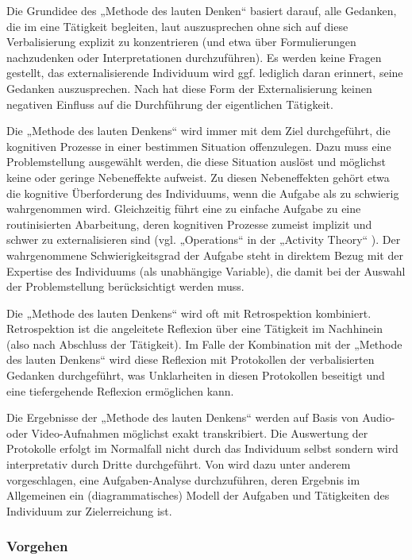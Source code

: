 Die Grundidee des „Methode des lauten Denken“ basiert darauf, alle Gedanken, die im eine Tätigkeit begleiten, laut auszusprechen ohne sich auf diese Verbalisierung explizit zu konzentrieren (und etwa über Formulierungen nachzudenken oder Interpretationen durchzuführen). Es werden keine Fragen gestellt, das externalisierende Individuum wird ggf. lediglich daran erinnert, seine Gedanken auszusprechen. Nach \citet{Van-Someren94} hat diese Form der Externalisierung keinen negativen Einfluss auf die Durchführung der eigentlichen Tätigkeit.

Die „Methode des lauten Denkens“ wird immer mit dem Ziel durchgeführt, die kognitiven Prozesse in einer bestimmen Situation offenzulegen. Dazu muss eine Problemstellung ausgewählt werden, die diese Situation auslöst und möglichst keine oder geringe Nebeneffekte aufweist. Zu diesen Nebeneffekten gehört etwa die kognitive Überforderung des Individuums, wenn die Aufgabe als zu schwierig wahrgenommen wird. Gleichzeitig führt eine zu einfache Aufgabe zu eine routinisierten Abarbeitung, deren kognitiven Prozesse zumeist implizit und schwer zu externalisieren sind (vgl. „Operations“ in der „Activity Theory“ \citep{Leontev78}). Der wahrgenommene Schwierigkeitsgrad der Aufgabe steht in direktem Bezug mit der Expertise des Individuums (als unabhängige Variable), die damit bei der Auswahl der Problemstellung berücksichtigt werden muss.

Die „Methode des lauten Denkens“ wird oft mit Retrospektion kombiniert. Retrospektion ist die angeleitete Reflexion über eine Tätigkeit im Nachhinein (also nach Abschluss der Tätigkeit). Im Falle der Kombination mit der „Methode des lauten Denkens“ wird diese Reflexion mit Protokollen der verbalisierten Gedanken durchgeführt, was Unklarheiten in diesen Protokollen beseitigt und eine tiefergehende Reflexion ermöglichen kann. 

Die Ergebnisse der „Methode des lauten Denkens“ werden auf Basis von Audio- oder Video-Aufnahmen möglichst exakt transkribiert. Die Auswertung der Protokolle erfolgt im Normalfall nicht durch das Individuum selbst sondern wird interpretativ durch Dritte durchgeführt. Von \citet{Van-Someren94} wird dazu unter anderem vorgeschlagen, eine Aufgaben-Analyse durchzuführen, deren Ergebnis im Allgemeinen ein (diagrammatisches) Modell der Aufgaben und Tätigkeiten des Individuum zur Zielerreichung ist.

\subsubsection{Vorgehen}

